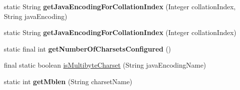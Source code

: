 \begin{DoxyCompactItemize}
static String {\bfseries get\+Java\+Encoding\+For\+Collation\+Index} (Integer collation\+Index, String java\+Encoding)
\item 
\mbox{\label{classcom_1_1mysql_1_1cj_1_1_charset_mapping_ab115c04c08a0186854fbff12ba9c6168}} 
static String {\bfseries get\+Java\+Encoding\+For\+Collation\+Index} (Integer collation\+Index)
\item 
\mbox{\label{classcom_1_1mysql_1_1cj_1_1_charset_mapping_a244f431cb6b92e6479a3b492723d8942}} 
static final int {\bfseries get\+Number\+Of\+Charsets\+Configured} ()
\item 
final static boolean \mbox{\hyperlink{classcom_1_1mysql_1_1cj_1_1_charset_mapping_a391d1057e001d901ed4a4b4170513f31}{is\+Multibyte\+Charset}} (String java\+Encoding\+Name)
\item 
\mbox{\label{classcom_1_1mysql_1_1cj_1_1_charset_mapping_af089a4b1c57135f56e6112fc1abdaeae}} 
static int {\bfseries get\+Mblen} (String charset\+Name)
\end{DoxyCompactItemize}
